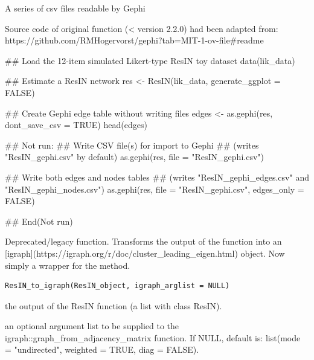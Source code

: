 \documentclass[a4paper]{book}
\begin{document}
%
\begin{Value}
A series of csv files readable by Gephi
\end{Value}
%
\begin{References}
Source code of original function (< version 2.2.0) had been adapted from: https://github.com/RMHogervorst/gephi?tab=MIT-1-ov-file\#readme
\end{References}
%
\begin{Examples}
\begin{ExampleCode}
## Load the 12-item simulated Likert-type ResIN toy dataset
data(lik_data)

## Estimate a ResIN network
res <- ResIN(lik_data, generate_ggplot = FALSE)

## Create Gephi edge table without writing files
edges <- as.gephi(res, dont_save_csv = TRUE)
head(edges)

## Not run: 
## Write CSV file(s) for import to Gephi
## (writes "ResIN_gephi.csv" by default)
as.gephi(res, file = "ResIN_gephi.csv")

## Write both edges and nodes tables
## (writes "ResIN_gephi_edges.csv" and "ResIN_gephi_nodes.csv")
as.gephi(res, file = "ResIN_gephi.csv", edges_only = FALSE)

## End(Not run)


\end{ExampleCode}
\end{Examples}
%
\begin{Description}
Deprecated/legacy function. Transforms the output of the  function into an [igraph](https://igraph.org/r/doc/cluster\_leading\_eigen.html) object. Now simply a wrapper for the  method.
\end{Description}
%
\begin{Usage}
\begin{verbatim}
ResIN_to_igraph(ResIN_object, igraph_arglist = NULL)
\end{verbatim}
\end{Usage}
%
\begin{Arguments}
\begin{ldescription}
\item[\code{ResIN\_object}] the output of the ResIN function (a list with class ResIN).

\item[\code{igraph\_arglist}] an optional argument list to be supplied to the igraph::graph\_from\_adjacency\_matrix function. If NULL, default is: list(mode = "undirected", weighted = TRUE, diag = FALSE).
\end{ldescription}
\end{Arguments}
\end{document}
